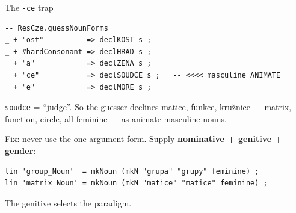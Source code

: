 \documentclass[10pt,aspectratio=169]{beamer}
\newcommand{\bad}[1]{\textcolor{warn}{#1}}
\newcommand{\ok}[1]{\textcolor{good}{#1}}
\begin{document}
\begin{frame}[fragile]{The \texttt{-ce} trap}
\begin{lstlisting}
-- ResCze.guessNounForms
_ + "ost"          => declKOST s ;
_ + #hardConsonant => declHRAD s ;
_ + "a"            => declZENA s ;
_ + "ce"           => declSOUDCE s ;   -- <<<< masculine ANIMATE
_ + "e"            => declMORE s ;
\end{lstlisting}

  \vspace{0.5em}
  \texttt{soudce} = ``judge''. So the guesser declines
  \bad{matice}, \bad{funkce}, \bad{kružnice} --- matrix, function, circle,
  all feminine --- as animate masculine nouns.

  \vspace{0.5em}
  \ok{Fix}: never use the one-argument form. Supply
  \textbf{nominative + genitive + gender}:
\begin{lstlisting}
lin 'group_Noun'  = mkNoun (mkN "grupa" "grupy" feminine) ;
lin 'matrix_Noun' = mkNoun (mkN "matice" "matice" feminine) ;
\end{lstlisting}
  The genitive selects the paradigm.
\end{frame}
\end{document}
